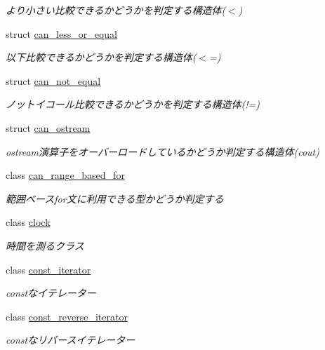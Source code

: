 \begin{DoxyCompactItemize}
\begin{DoxyCompactList}\small\item\em より小さい比較できるかどうかを判定する構造体($<$) \end{DoxyCompactList}\item 
struct \mbox{\hyperlink{structsaki_1_1can__less__or__equal}{can\+\_\+less\+\_\+or\+\_\+equal}}
\begin{DoxyCompactList}\small\item\em 以下比較できるかどうかを判定する構造体($<$=) \end{DoxyCompactList}\item 
struct \mbox{\hyperlink{structsaki_1_1can__not__equal}{can\+\_\+not\+\_\+equal}}
\begin{DoxyCompactList}\small\item\em ノットイコール比較できるかどうかを判定する構造体(!=) \end{DoxyCompactList}\item 
struct \mbox{\hyperlink{structsaki_1_1can__ostream}{can\+\_\+ostream}}
\begin{DoxyCompactList}\small\item\em ostream演算子をオーバーロードしているかどうか判定する構造体(cout) \end{DoxyCompactList}\item 
class \mbox{\hyperlink{classsaki_1_1can__range__based__for}{can\+\_\+range\+\_\+based\+\_\+for}}
\begin{DoxyCompactList}\small\item\em 範囲ベースfor文に利用できる型かどうか判定する \end{DoxyCompactList}\item 
class \mbox{\hyperlink{classsaki_1_1clock}{clock}}
\begin{DoxyCompactList}\small\item\em 時間を測るクラス \end{DoxyCompactList}\item 
class \mbox{\hyperlink{classsaki_1_1const__iterator}{const\+\_\+iterator}}
\begin{DoxyCompactList}\small\item\em constなイテレーター \end{DoxyCompactList}\item 
class \mbox{\hyperlink{classsaki_1_1const__reverse__iterator}{const\+\_\+reverse\+\_\+iterator}}
\begin{DoxyCompactList}\small\item\em constなリバースイテレーター \end{DoxyCompactList}\item 

\end{DoxyCompactItemize}
